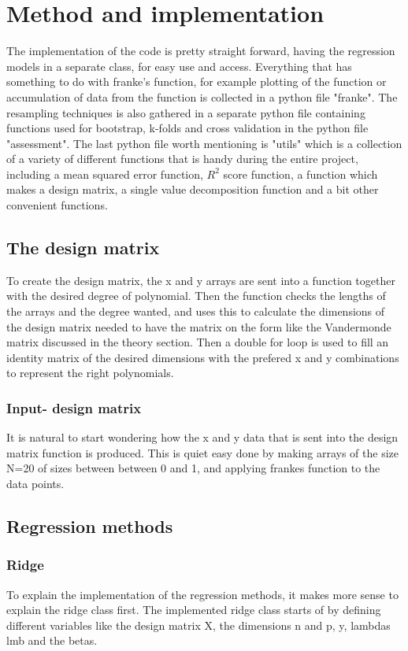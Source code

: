 \documentclass[../main.tex]{subfiles}
\begin{document}
\section{Method and implementation}\label{sec:method}
The implementation of the code is pretty straight forward, having the regression models in a separate class, for easy use and access. Everything that has something to do with franke's function, for example plotting of the function or accumulation of data from the function is collected in a python file "franke". The resampling techniques is also gathered in a separate python file containing functions used for bootstrap, k-folds and cross validation in the python file "assessment". The last python file worth mentioning is "utils" which is a collection of a variety of different functions that is handy during the entire project, including a mean squared error function, $R^2$ score function, a function which makes a design matrix, a single value decomposition function and a bit other convenient functions.

\subsection{The design matrix}
To create the design matrix, the x and y arrays are sent into a function together with the desired degree of polynomial. Then the function checks the lengths of the arrays and the degree wanted, and uses this to calculate the dimensions of the design matrix needed to have the matrix on the form like the Vandermonde matrix discussed in the theory section. Then a double for loop is used to fill an identity matrix of the desired dimensions with the prefered x and y combinations to represent the right polynomials.

\subsubsection{Input- design matrix}
It is natural to start wondering how the x and y data that is sent into the design matrix function is produced. This is quiet easy done by making arrays of the size N=20 of sizes between between 0 and 1, and applying frankes function to the data points.

\subsection{Regression methods}
\subsubsection{Ridge}
To explain the implementation of the regression methods, it makes more sense to explain the ridge class first. The implemented ridge class starts of by defining different variables like the design matrix X, the dimensions n and p, y, lambdas lmb and the betas.\\
\end{document}
